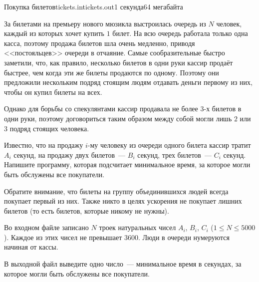 \documentclass[12pt,a4paper,oneside,twocolumn,landscape]{article}
\begin{document}
\raggedbottom

\begin{problem}{Покупка билетов}{tickets.in}{tickets.out}{1 секунда}{64 мегабайта}{}
\graphicspath{{.././statements/}}


За билетами на премьеру нового мюзикла выстроилась очередь из $N$ человек, каждый из которых хочет купить $1$ билет. На всю очередь работала только одна касса, поэтому продажа билетов шла очень медленно, приводя <<постояльцев>> очереди в отчаяние. 
Самые сообразительные быстро заметили, что, как правило, несколько билетов в одни руки кассир продаёт быстрее, чем когда эти же билеты продаются по одному. Поэтому они предложили нескольким подряд стоящим людям отдавать деньги первому из них, чтобы он купил билеты на всех. 

Однако для борьбы со спекулянтами кассир продавала не более $3$-х билетов в одни руки, поэтому договориться таким образом между собой могли лишь $2$ или $3$ подряд стоящих человека.

Известно, что на продажу $i$-му человеку из очереди одного билета кассир тратит $A_i$ секунд, на продажу двух билетов~--- $B_i$ секунд, трех билетов~--- $C_i$ секунд. Напишите программу, которая подсчитает минимальное время, за которое могли быть обслужены все покупатели.

Обратите внимание, что билеты на группу объединившихся людей всегда покупает первый из них. Также никто в целях ускорения не покупает лишних билетов (то есть билетов, которые никому не нужны).

\InputFile
Во входном файле записано $N$ троек натуральных чисел $A_i$, $B_i$, $C_i$ ($1 \leqslant N \leqslant 5000$). Каждое из этих чисел не превышает $3600$.
 Люди в очереди нумеруются начиная от кассы.

\OutputFile
В выходной файл выведите одно число~--- минимальное время в секундах, за которое могли быть обслужены все покупатели.


\Example

\begin{example}
%
\end{example}


\end{problem}
\end{document}
